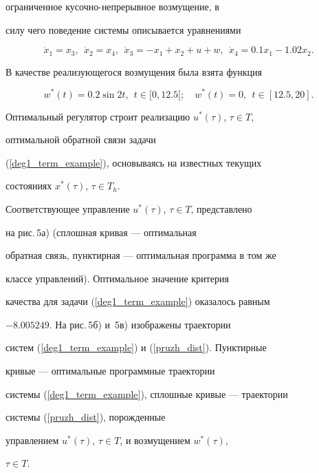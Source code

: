 \begin{exam}
ограниченное ку\-соч\-но-непрерывное возмущение, в


силу чего поведение системы описывается уравнениями


\begin{equation}\label{pruzh_dist}


\Dot x_1 = x_3, \ \ \Dot x_2 = x_4, \ \ \Dot x_3 = -x_1 + x_2 + u + w,


\ \ \Dot x_4 = 0.1 x_1 - 1.02 x_2.


\end{equation}


В качестве реализующегося возмущения была взята функция


$$


w^*(t) = 0.2 \sin 2t, \ \ t \in [0, 12.5[; \quad w^*(t) = 0, \ \ t \in


[12.5, 20].


$$


Оптимальный регулятор строит реализацию $u^*(\tau)$, $\tau \in T$,


оптимальной обратной связи задачи


(\ref{deg1_term_example}), основываясь на известных текущих


состояниях $x^*(\tau)$, $\tau \in T_h$.


Соответствующее управление $u^*(\tau)$, $\tau \in T$, представлено


на рис.\,5а) (сплошная кривая --- оптимальная


обратная связь, пунктирная --- оптимальная программа в том же


классе управлений). Оптимальное значение критерия


качества для задачи (\ref{deg1_term_example}) оказалось равным


$-8.005249$. На рис.\,5б) и~5в) изображены траектории


систем (\ref{deg1_term_example}) и (\ref{pruzh_dist}). Пунктирные


кривые --- оптимальные программные траектории


системы (\ref{deg1_term_example}), сплошные кривые --- траектории


системы (\ref{pruzh_dist}), порожденные


управлением $u^*(\tau)$, $\tau \in T$, и возмущением $w^*(\tau)$,


$\tau \in T$.





\begin{center}



\end{center}
\end{exam}
